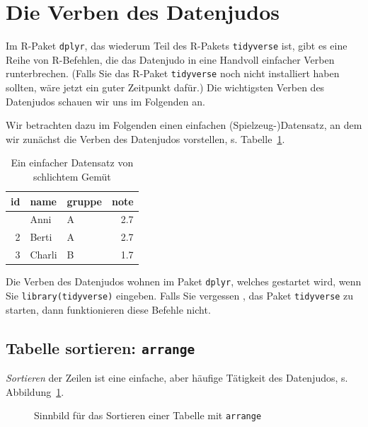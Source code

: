 \documentclass[
  letterpaper,
  oneside,
  open=any]{scrbook}
\theoremstyle{definition}
\theoremstyle{definition}
\theoremstyle{definition}
\theoremstyle{remark}
\begin{document}
\section{Die Verben des Datenjudos}\label{die-verben-des-datenjudos}

Im R-Paket \texttt{dplyr}, das wiederum Teil des R-Pakets
\texttt{tidyverse} ist, gibt es eine Reihe von R-Befehlen, die das
Datenjudo in eine Handvoll einfacher Verben runterbrechen. (Falls Sie
das R-Paket \texttt{tidyverse} noch nicht installiert haben sollten,
wäre jetzt ein guter Zeitpunkt dafür.) Die wichtigsten Verben des
Datenjudos schauen wir uns im Folgenden an.

Wir betrachten dazu im Folgenden einen einfachen (Spielzeug-)Datensatz,
an dem wir zunächst die Verben des Datenjudos vorstellen, s.
Tabelle~\ref{tbl-datenjudo}.

\begin{longtable}[]{@{}rllr@{}}

\caption{\label{tbl-datenjudo}Ein einfacher Datensatz von schlichtem
Gemüt}

\tabularnewline

\toprule\noalign{}
id & name & gruppe & note \\
\midrule\noalign{}
\endhead
\bottomrule\noalign{}
\endlastfoot
1 & Anni & A & 2.7 \\
2 & Berti & A & 2.7 \\
3 & Charli & B & 1.7 \\

\end{longtable}

Die Verben des Datenjudos wohnen im Paket \texttt{dplyr}, welches
gestartet wird, wenn Sie \texttt{library(tidyverse)} eingeben. Falls Sie
vergessen , das Paket \texttt{tidyverse} zu starten, dann funktionieren
diese Befehle nicht.

\subsection{\texorpdfstring{Tabelle sortieren:
\texttt{arrange}}{Tabelle sortieren: arrange}}\label{tabelle-sortieren-arrange}

\emph{Sortieren} der Zeilen ist eine einfache, aber häufige Tätigkeit
des Datenjudos, s. Abbildung~\ref{fig-arrange}.

\begin{figure}


\caption{\label{fig-arrange}Sinnbild für das Sortieren einer Tabelle mit
\texttt{arrange}}

\end{figure}%
\end{document}
